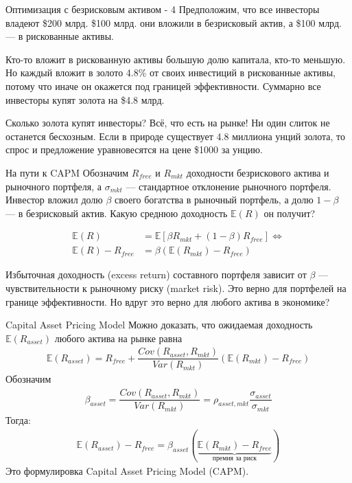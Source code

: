 \documentclass{beamer}
\begin{document}
\begin{frame}{Оптимизация с безрисковым активом - 4}
\justify
Предположим, что все инвесторы владеют \$200 млрд. \$100 млрд. они вложили в безрисковый актив, а \$100 млрд. --- в рискованные активы.

\justify
Кто-то вложит в рискованную активы большую долю капитала, кто-то меньшую. Но каждый вложит в золото 4.8\% от своих инвестиций в рискованные активы, потому что иначе он окажется под границей эффективности. Суммарно все инвесторы купят золота на \$4.8 млрд.

\justify
Сколько золота купят инвесторы? Всё, что есть на рынке! Ни один слиток не останется бесхозным. Если в природе существует 4.8 миллиона унций золота, то спрос и предложение уравновесятся на цене \$1000 за унцию.
\end{frame}



\begin{frame}{На пути к CAPM}
\justify
Обозначим $R_{free}$ и $R_{mkt}$ доходности безрискового актива и рыночного портфеля, а $\sigma_{mkt}$ --- стандартное отклонение рыночного портфеля. Инвестор вложил долю $\beta$ своего богатства в рыночный портфель, а долю $1-\beta$ --- в безрисковый актив. Какую среднюю доходность $\mathbb{E}(R)$ он получит?

\begin{align*}
\mathbb{E}(R) &= \mathbb{E}\left[ \beta R_{mkt} + (1 - \beta)R_{free} \right] \Leftrightarrow \\
\mathbb{E}(R) - R_{free} &= \beta (\mathbb{E}(R_{mkt}) - R_{free})
\end{align*}

Избыточная доходность (excess return) составного портфеля зависит от $\beta$ --- чувствительности к рыночному риску (market risk). Это верно для портфелей на границе эффективности. Но вдруг это верно для любого актива в экономике?
\end{frame}



\begin{frame}{Capital Asset Pricing Model}
Можно доказать, что ожидаемая доходность $\mathbb{E}(R_{asset})$ любого актива на рынке равна
\begin{align*}
\mathbb{E}(R_{asset}) = R_{free} + \dfrac{Cov(R_{asset}, R_{mkt})}{Var(R_{mkt})} \left (\mathbb{E}(R_{mkt}) - R_{free} \right)
\end{align*}
Обозначим
\begin{align*}
\beta_{asset} = \dfrac{Cov(R_{asset}, R_{mkt})}{Var(R_{mkt})} = \rho_{asset,mkt}\dfrac{\sigma_{asset}}{\sigma_{mkt}}
\end{align*}
Тогда:
\begin{align*}
\mathbb{E}(R_{asset}) - R_{free} = \beta_{asset}(\underbrace{\mathbb{E}(R_{mkt}) - R_{free}}_{\text{премия за риск}})
\end{align*}
Это формулировка Capital Asset Pricing Model (CAPM).
\end{frame}
\end{document}
